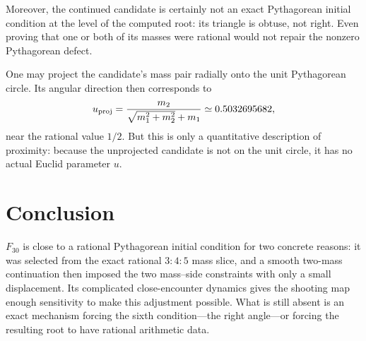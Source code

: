 \documentclass[11pt]{article}
\begin{document}
Moreover, the continued candidate is certainly not an exact Pythagorean
initial condition at the level of the computed root: its triangle is obtuse,
not right.  Even proving that one or both of its masses were rational would not
repair the nonzero Pythagorean defect.

One may project the candidate's mass pair radially onto the unit Pythagorean
circle.  Its angular direction then corresponds to
\[
 u_{\rm proj}=\frac{m_2}{\sqrt{m_1^2+m_2^2}+m_1}
              \simeq0.5032695682,
\]
near the rational value $1/2$.  But this is only a quantitative description
of proximity: because the unprojected candidate is not on the unit circle,
it has no actual Euclid parameter $u$.

\section*{Conclusion}

$F_{30}$ is close to a rational Pythagorean initial condition for two concrete
reasons: it was selected from the exact rational $3{:}4{:}5$ mass slice, and a
smooth two-mass continuation then imposed the two mass--side constraints with
only a small displacement.  Its complicated close-encounter dynamics gives
the shooting map enough sensitivity to make this adjustment possible.  What
is still absent is an exact mechanism forcing the sixth condition---the right
angle---or forcing the resulting root to have rational arithmetic data.
\end{document}
